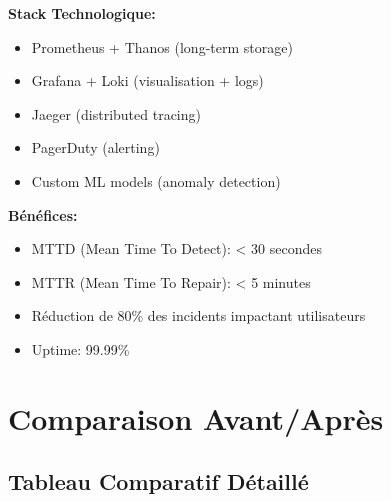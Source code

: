 \documentclass[12pt,a4paper]{article}
\begin{document}
\begin{tcolorbox}[colback=green!5,colframe=green!50!black,title=\textbf{Nouveau Composant: AI Ops Platform}]
\textbf{Stack Technologique:}
\begin{itemize}[noitemsep]
    \item Prometheus + Thanos (long-term storage)
    \item Grafana + Loki (visualisation + logs)
    \item Jaeger (distributed tracing)
    \item PagerDuty (alerting)
    \item Custom ML models (anomaly detection)
\end{itemize}

\textbf{Bénéfices:}
\begin{itemize}[noitemsep]
    \item MTTD (Mean Time To Detect): < 30 secondes
    \item MTTR (Mean Time To Repair): < 5 minutes
    \item Réduction de 80\% des incidents impactant utilisateurs
    \item Uptime: 99.99\%
\end{itemize}
\end{tcolorbox}

\newpage
\section{Comparaison Avant/Après}

\subsection{Tableau Comparatif Détaillé}
\end{document}
